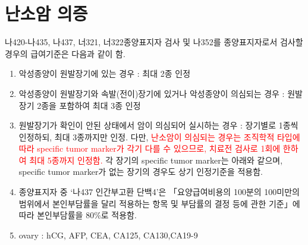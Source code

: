 \section{난소암 의증}
%
{
나420-나435, 나437, 너321, 너322종양표지자 검사 및 나352를 종양표지자로서 검사할 경우의 급여기준은 다음과 같이 함.
\begin{enumerate}[가.]
\item 악성종양이 원발장기에 있는 경우 : 최대 2종 인정
\item 악성종양이 원발장기와 속발(전이)장기에 있거나 악성종양이 의심되는 경우 : 원발장기 2종을 포함하여 최대 3종 인정
\item 원발장기가 확인이 안된 상태에서 암이 의심되어 실시하는 경우 : 장기별로 1종씩 인정하되, 최대 3종까지만 인정. 다만, \textcolor{red}{난소암이 의심되는 경우는 조직학적 타입에 따라 specific tumor marker가 각기 다를 수 있으므로, 치료전 검사로 1회에 한하여 최대 5종까지 인정함.} 각 장기의 specific tumor marker는 아래와 같으며, specific tumor marker가 없는 장기의 경우도 상기 인정기준을 적용함.
\item 종양표지자 중 ‘나437 인간부고환 단백4’은 「요양급여비용의 100분의 100미만의 범위에서 본인부담률을 달리 적용하는 항목 및 부담률의 결정 등에 관한 기준」에 따라 본인부담률을 80\%로 적용함.
\item ovary : hCG, AFP, CEA, CA125, CA130,CA19-9
\end{enumerate}
}

